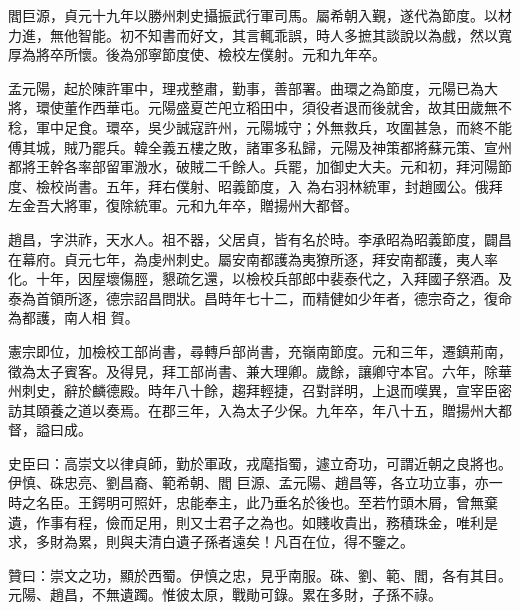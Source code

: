 \begin{pinyinscope}
 閻巨源，貞元十九年以勝州刺史攝振武行軍司馬。屬希朝入覲，遂代為節度。以材力進，無他智能。初不知書而好文，其言輒乖誤，時人多摭其談說以為戲，然以寬厚為將卒所懷。後為邠寧節度使、檢校左僕射。元和九年卒。



 孟元陽，起於陳許軍中，理戎整肅，勤事，善部署。曲環之為節度，元陽已為大將，環使董作西華屯。元陽盛夏芒戺立稻田中，須役者退而後就舍，故其田歲無不稔，軍中足食。環卒，吳少誠寇許州，元陽城守；外無救兵，攻圍甚急，而終不能傅其城，賊乃罷兵。韓全義五樓之敗，諸軍多私歸，元陽及神策都將蘇元策、宣州都將王幹各率部留軍溵水，破賊二千餘人。兵罷，加御史大夫。元和初，拜河陽節度、檢校尚書。五年，拜右僕射、昭義節度，入
 為右羽林統軍，封趙國公。俄拜左金吾大將軍，復除統軍。元和九年卒，贈揚州大都督。



 趙昌，字洪祚，天水人。祖不器，父居貞，皆有名於時。李承昭為昭義節度，闢昌在幕府。貞元七年，為虔州刺史。屬安南都護為夷獠所逐，拜安南都護，夷人率化。十年，因屋壞傷脛，懇疏乞還，以檢校兵部郎中裴泰代之，入拜國子祭酒。及泰為首領所逐，德宗詔昌問狀。昌時年七十二，而精健如少年者，德宗奇之，復命為都護，南人相
 賀。



 憲宗即位，加檢校工部尚書，尋轉戶部尚書，充嶺南節度。元和三年，遷鎮荊南，徵為太子賓客。及得見，拜工部尚書、兼大理卿。歲餘，讓卿守本官。六年，除華州刺史，辭於麟德殿。時年八十餘，趨拜輕捷，召對詳明，上退而嘆異，宣宰臣密訪其頤養之道以奏焉。在郡三年，入為太子少保。九年卒，年八十五，贈揚州大都督，謚曰成。



 史臣曰：高崇文以律貞師，勤於軍政，戎麾指蜀，遽立奇功，可謂近朝之良將也。伊慎、硃忠亮、劉昌裔、範希朝、閻
 巨源、孟元陽、趙昌等，各立功立事，亦一時之名臣。王鍔明可照奸，忠能奉主，此乃垂名於後也。至若竹頭木屑，曾無棄遺，作事有程，儉而足用，則又士君子之為也。如賤收貴出，務積珠金，唯利是求，多財為累，則與夫清白遺子孫者遠矣！凡百在位，得不鑒之。



 贊曰：崇文之功，顯於西蜀。伊慎之忠，見乎南服。硃、劉、範、閻，各有其目。元陽、趙昌，不無遺躅。惟彼太原，戰勛可錄。累在多財，子孫不祿。



\end{pinyinscope}